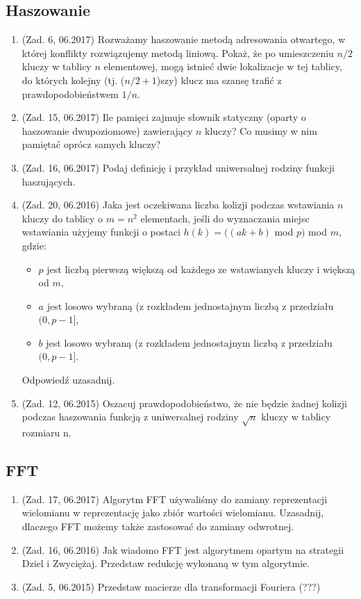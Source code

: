 \documentclass[10pt]{article}%
\begin{document}
\subsection*{Haszowanie}
\begin{enumerate}
\item (Zad. 6, 06.2017) Rozważamy haszowanie metodą adresowania otwartego, w której konflikty rozwiązujemy metodą liniową. Pokaż, że po umieszczeniu $n/2$ kluczy w tablicy $n$ elementowej, mogą istnieć dwie lokalizacje w tej tablicy, do których kolejny (tj. ($n/2 + 1$)szy) klucz ma szansę trafić z prawdopodobieństwem $1/n$.

\item (Zad. 15, 06.2017) Ile pamięci zajmuje słownik statyczny (oparty o haszowanie dwupoziomowe) zawierający $n$ kluczy? Co musimy w nim pamiętać oprócz samych kluczy?

\item (Zad. 16, 06.2017) Podaj definicję i przykład uniwersalnej rodziny funkcji haszujących.

\item (Zad. 20, 06.2016) Jaka jest oczekiwana liczba kolizji podczas wstawiania $n$ kluczy do tablicy o $ m = n^2 $ elementach, jeśli do wyznaczania miejsc wstawiania użyjemy funkcji o postaci $h(k) = ((ak + b)$ mod $p)$ mod $m$, gdzie:
\begin{itemize}
\item $p$ jest liczbą pierwszą większą od każdego ze wstawianych kluczy i większą od $m$,
\item $a$ jest losowo wybraną (z rozkładem jednostajnym liczbą z przedziału $(0, p-1]$,
\item $b$ jest losowo wybraną (z rozkładem jednostajnym liczbą z przedziału $(0, p-1]$.
\end{itemize} 
Odpowiedź uzasadnij.

\item (Zad. 12, 06.2015) Oszacuj prawdopodobieństwo, że nie będzie żadnej kolizji podczas haszowania funkcją z uniwersalnej rodziny $\sqrt{n}$ kluczy w tablicy rozmiaru n. 
\end{enumerate}
\subsection*{FFT}
\begin{enumerate}
\item (Zad. 17, 06.2017) Algorytm FFT używaliśmy do zamiany reprezentacji wielomianu w reprezentację jako zbiór wartości wielomianu. Uzasadnij, dlaczego FFT możemy także zastosować do zamiany odwrotnej.

\item (Zad. 16, 06.2016) Jak wiadomo FFT jest algorytmem opartym na strategii Dziel i Zwyciężaj. Przedstaw redukcję wykonaną w tym algorytmie.

\item (Zad. 5, 06.2015) Przedstaw macierze dla transformacji Fouriera (???)
\end{enumerate}
\end{document}
